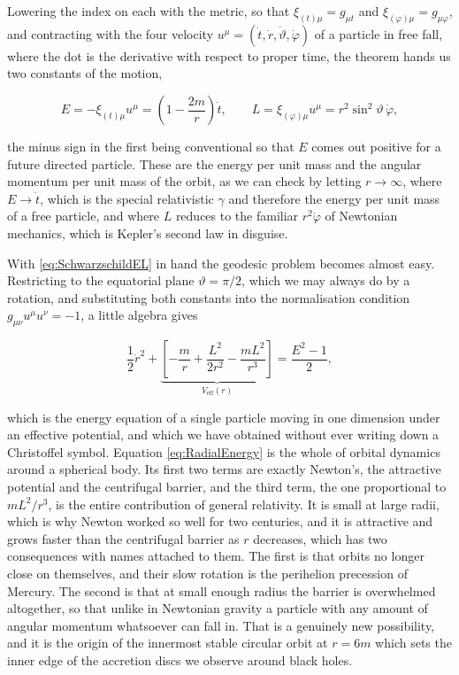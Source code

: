         Lowering the index on each with the metric, so that $\xi_{(t)\mu} = g_{\mu t}$ and $\xi_{(\varphi)\mu}=g_{\mu\varphi}$, and contracting with the four velocity $u^{\mu} = (\dot{t},\dot{r},\dot{\vartheta},\dot{\varphi})$ of a particle in free fall, where the dot is the derivative with respect to proper time, the theorem hands us two constants of the motion,

        \begin{equation}\label{eq:SchwarzschildEL}
            E = -\xi_{(t)\mu}u^{\mu} = \left(1-\frac{2m}{r}\right)\dot{t}, \qquad L = \xi_{(\varphi)\mu}u^{\mu} = r^2\sin^2\vartheta\,\dot{\varphi},
        \end{equation}

        the minus sign in the first being conventional so that $E$ comes out positive for a future directed particle. These are the energy per unit mass and the angular momentum per unit mass of the orbit, as we can check by letting $r\rightarrow\infty$, where $E\rightarrow\dot{t}$, which is the special relativistic $\gamma$ and therefore the energy per unit mass of a free particle, and where $L$ reduces to the familiar $r^2\dot{\varphi}$ of Newtonian mechanics, which is Kepler's second law in disguise.

        With \ref{eq:SchwarzschildEL} in hand the geodesic problem becomes almost easy. Restricting to the equatorial plane $\vartheta=\pi/2$, which we may always do by a rotation, and substituting both constants into the normalisation condition $g_{\mu\nu}u^{\mu}u^{\nu}=-1$, a little algebra gives

        \begin{equation}\label{eq:RadialEnergy}
            \frac{1}{2}\dot{r}^2 + \underbrace{\left[-\frac{m}{r} + \frac{L^2}{2r^2} - \frac{mL^2}{r^3}\right]}_{V_{\text{eff}}(r)} = \frac{E^2-1}{2},
        \end{equation}

        which is the energy equation of a single particle moving in one dimension under an effective potential, and which we have obtained without ever writing down a Christoffel symbol. Equation \ref{eq:RadialEnergy} is the whole of orbital dynamics around a spherical body. Its first two terms are exactly Newton's, the attractive potential and the centrifugal barrier, and the third term, the one proportional to $m L^2/r^3$, is the entire contribution of general relativity. It is small at large radii, which is why Newton worked so well for two centuries, and it is attractive and grows faster than the centrifugal barrier as $r$ decreases, which has two consequences with names attached to them. The first is that orbits no longer close on themselves, and their slow rotation is the perihelion precession of Mercury. The second is that at small enough radius the barrier is overwhelmed altogether, so that unlike in Newtonian gravity a particle with any amount of angular momentum whatsoever can fall in. That is a genuinely new possibility, and it is the origin of the innermost stable circular orbit at $r=6m$ which sets the inner edge of the accretion discs we observe around black holes.

